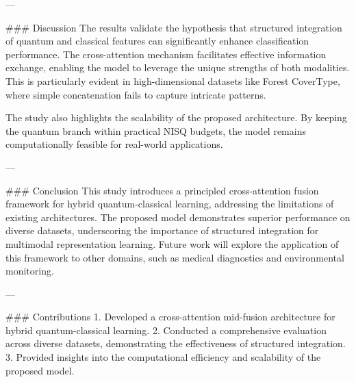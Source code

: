 ---

### Discussion
The results validate the hypothesis that structured integration of quantum and classical features can significantly enhance classification performance. The cross-attention mechanism facilitates effective information exchange, enabling the model to leverage the unique strengths of both modalities. This is particularly evident in high-dimensional datasets like Forest CoverType, where simple concatenation fails to capture intricate patterns.

The study also highlights the scalability of the proposed architecture. By keeping the quantum branch within practical NISQ budgets, the model remains computationally feasible for real-world applications.

---

### Conclusion
This study introduces a principled cross-attention fusion framework for hybrid quantum-classical learning, addressing the limitations of existing architectures. The proposed model demonstrates superior performance on diverse datasets, underscoring the importance of structured integration for multimodal representation learning. Future work will explore the application of this framework to other domains, such as medical diagnostics and environmental monitoring.

---

### Contributions
1. Developed a cross-attention mid-fusion architecture for hybrid quantum-classical learning.
2. Conducted a comprehensive evaluation across diverse datasets, demonstrating the effectiveness of structured integration.
3. Provided insights into the computational efficiency and scalability of the proposed model.

